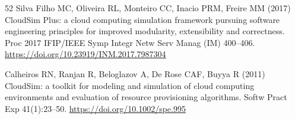\documentclass[pdflatex,onecolumn,sn-mathphys-num]{sn-jnl}
\begin{document}
\begin{thebibliography}{52}
Silva Filho MC, Oliveira RL, Monteiro CC, Inacio PRM, Freire MM (2017) CloudSim Plus: a cloud computing simulation framework pursuing software engineering principles for improved modularity, extensibility and correctness. Proc 2017 IFIP/IEEE Symp Integr Netw Serv Manag (IM) 400--406. \url{https://doi.org/10.23919/INM.2017.7987304}

Calheiros RN, Ranjan R, Beloglazov A, De Rose CAF, Buyya R (2011) CloudSim: a toolkit for modeling and simulation of cloud computing environments and evaluation of resource provisioning algorithms. Softw Pract Exp 41(1):23--50. \url{https://doi.org/10.1002/spe.995}

\end{thebibliography}
\end{document}
